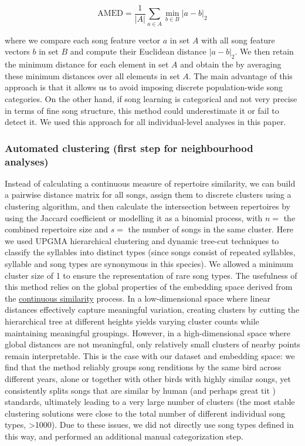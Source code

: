 \documentclass[9pt, onecolumn, twoside, lineno]{gsajnl}
\begin{document}
\begin{equation} 
\label{eq1}
\text{AMED} = \frac{1}{|A|} \sum_{a \in A} \min_{b \in B} \left| a - b \right|_2
\end{equation}

where we compare each song feature vector $a$ in set $A$ with all song feature vectors $b$ in set $B$ and compute their Euclidean distance $\left| a - b \right|_2$. We then retain the minimum distance for each element in set $A$ and obtain the  by averaging these minimum distances over all elements in set $A$.
The main advantage of this approach is that it allows us to avoid imposing discrete population-wide song categories. On the other hand, if song learning is categorical and not very precise in terms of fine song structure, this method could underestimate it or fail to detect it. We used this approach for all individual-level analyses in this paper. 

\subsubsection{Automated clustering (first step for neighbourhood analyses)}

Instead of calculating a continuous measure of repertoire similarity, we can build a pairwise distance matrix for all songs, assign them to discrete clusters using a clustering algorithm, and then calculate the intersection between repertoires by using the Jaccard coefficient or modelling it as a binomial process, with $n = $ the combined repertoire size and $s = $ the number of songs in the same cluster. Here we used UPGMA hierarchical clustering and dynamic tree-cut techniques to classify the syllables into distinct types (since songs consist of repeated syllables, syllable and song types are synonymous in this species). We allowed a minimum cluster size of 1 to ensure the representation of rare song types. The usefulness of this method relies on the global properties of the embedding space derived from the \hyperref[sc:song-similarity]{continuous similarity} process. In a low-dimensional space where linear distances effectively capture meaningful variation, creating clusters by cutting the hierarchical tree at different heights yields varying cluster counts while maintaining meaningful groupings. However, in a high-dimensional space where global distances are not meaningful, only relatively small clusters of nearby points remain interpretable. This is the case with our dataset and embedding space: we find that the method reliably groups song renditions by the same bird across different years, alone or together with other birds with highly similar songs, yet consistently splits songs that are similar by human (and perhaps great tit \autocite{falls1982}) standards, ultimately leading to a very large number of clusters (the most stable clustering solutions were close to the total number of different individual song types, >1000). Due to these issues, we did not directly use song types defined in this way, and performed an additional manual categorization step.
\end{document}
